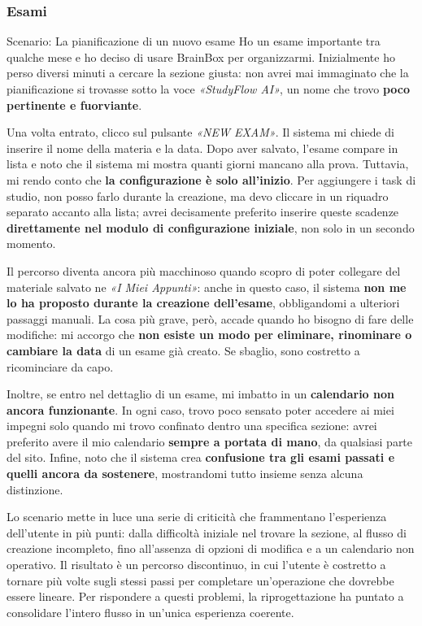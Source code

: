 \subsubsection{Esami}

\begin{scenario}{Scenario: La pianificazione di un nuovo esame}
  Ho un esame importante tra qualche mese e ho deciso di usare BrainBox per organizzarmi. Inizialmente ho perso diversi minuti a cercare la sezione giusta: non avrei mai immaginato che la pianificazione si trovasse sotto la voce \textit{«StudyFlow AI»}, un nome che trovo \textbf{poco pertinente e fuorviante}.

  Una volta entrato, clicco sul pulsante \textit{«NEW EXAM»}. Il sistema mi chiede di inserire il nome della materia e la data. Dopo aver salvato, l'esame compare in lista e noto che il sistema mi mostra quanti giorni mancano alla prova. Tuttavia, mi rendo conto che \textbf{la configurazione è solo all'inizio}. Per aggiungere i task di studio, non posso farlo durante la creazione, ma devo cliccare in un riquadro separato accanto alla lista; avrei decisamente preferito inserire queste scadenze \textbf{direttamente nel modulo di configurazione iniziale}, non solo in un secondo momento.

  Il percorso diventa ancora più macchinoso quando scopro di poter collegare del materiale salvato ne \textit{«I Miei Appunti»}: anche in questo caso, il sistema \textbf{non me lo ha proposto durante la creazione dell'esame}, obbligandomi a ulteriori passaggi manuali. La cosa più grave, però, accade quando ho bisogno di fare delle modifiche: mi accorgo che \textbf{non esiste un modo per eliminare, rinominare o cambiare la data} di un esame già creato. Se sbaglio, sono costretto a ricominciare da capo.

  Inoltre, se entro nel dettaglio di un esame, mi imbatto in un
  \textbf{calendario non ancora funzionante}. In ogni caso, trovo poco sensato poter accedere ai miei impegni solo quando mi trovo confinato dentro una specifica
  sezione: avrei preferito avere il mio calendario \textbf{sempre a portata di mano},
  da qualsiasi parte del sito. Infine, noto che il sistema crea
  \textbf{confusione tra gli esami passati e quelli ancora da sostenere}, mostrandomi tutto insieme senza alcuna distinzione.
\end{scenario}

Lo scenario mette in luce una serie di criticità che frammentano l'esperienza dell'utente in più punti: dalla difficoltà iniziale nel trovare la sezione, al flusso di creazione incompleto, fino all'assenza di opzioni di modifica e a un calendario non operativo. Il risultato è un percorso discontinuo, in cui l'utente è costretto a tornare più volte sugli stessi passi per completare un'operazione che dovrebbe essere lineare. Per rispondere a questi problemi,
la riprogettazione ha puntato a consolidare l'intero flusso in un'unica esperienza coerente.

